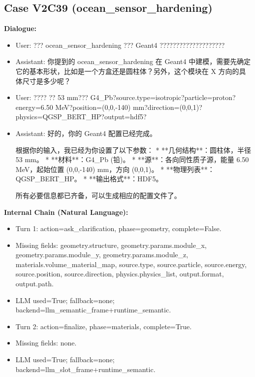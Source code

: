 \documentclass[11pt]{ctexart}
\begin{document}
\subsection{Case V2C39 (ocean\_sensor\_hardening)}
\textbf{Dialogue:}
\begin{itemize}
\item User: ??? ocean\_sensor\_hardening ??? Geant4 ????????????????????
\item Assistant: 你提到的 ocean\_sensor\_hardening 在 Geant4 中建模，需要先确定它的基本形状，比如是一个方盒还是圆柱体？另外，这个模块在 X 方向的具体尺寸是多少呢？
\item User: ???? ?? 53 mm??? G4\_Pb?source.type=isotropic?particle=proton?energy=6.50 MeV?position=(0,0,-140) mm?direction=(0,0,1)?physics=QGSP\_BERT\_HP?output=hdf5?
\item Assistant: 好的，你的 Geant4 配置已经完成。

根据你的输入，我已经为你设置了以下参数：
*   **几何结构**：圆柱体，半径 53 mm。
*   **材料**：G4\_Pb (铅)。
*   **源**：各向同性质子源，能量 6.50 MeV，起始位置 (0,0,-140) mm，方向 (0,0,1)。
*   **物理列表**：QGSP\_BERT\_HP。
*   **输出格式**：HDF5。

所有必要信息都已齐备，可以生成相应的配置文件了。
\end{itemize}
\textbf{Internal Chain (Natural Language):}
\begin{itemize}
\item Turn 1: action=ask\_clarification, phase=geometry, complete=False.
\item Missing fields: geometry.structure, geometry.params.module\_x, geometry.params.module\_y, geometry.params.module\_z, materials.volume\_material\_map, source.type, source.particle, source.energy, source.position, source.direction, physics.physics\_list, output.format, output.path.
\item LLM used=True; fallback=none; backend=llm\_semantic\_frame+runtime\_semantic.
\item Turn 2: action=finalize, phase=materials, complete=True.
\item Missing fields: none.
\item LLM used=True; fallback=none; backend=llm\_slot\_frame+runtime\_semantic.
\end{itemize}
\end{document}
